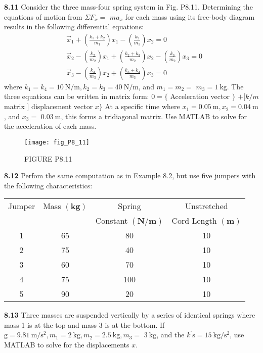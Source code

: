 \documentclass[../main.tex]{subfiles}
\begin{document}
\begin{multicols}{2}
    \noindent \textbf{8.11} Consider the three mass-four spring system in Fig. P8.11. Determining the equations of motion from $\Sigma F_{x}=$ $m a_{x}$ for each mass using its free-body diagram results in the
    following differential equations:
    $$
    \begin{aligned}
    &\vec{x}_{1}+\left(\frac{k_{1}+k_{2}}{m_{1}}\right) x_{1}-\left(\frac{k_{2}}{m_{1}}\right) x_{2}=0 \\
    &\vec{x}_{2}-\left(\frac{k_{2}}{m_{2}}\right) x_{1}+\left(\frac{k_{2}+k_{3}}{m_{2}}\right) x_{2}-\left(\frac{k_{3}}{m_{2}}\right) x_{3}=0 \\
    &\vec{x}_{3}-\left(\frac{k_{3}}{m_{3}}\right) x_{2}+\left(\frac{k_{3}+k_{4}}{m_{3}}\right) x_{3}=0
    \end{aligned}
    $$
    where $k_{1}=k_{4}=10 \mathrm{~N} / \mathrm{m}, k_{2}=k_{3}=40 \mathrm{~N} / \mathrm{m}$, and $m_{1}=m_{2}=$ $m_{3}=1 \mathrm{~kg}$. The three equations can be written in matrix form:
    $0=\{$ Acceleration vector $\}$
    $+[k / m$ matrix $]$ displacement vector $x\}$
    At a specific time where $x_{1}=0.05 \mathrm{~m}, x_{2}=0.04 \mathrm{~m}$, and $x_{3}=$ $0.03 \mathrm{~m}$, this forms a tridiagonal matrix. Use MATLAB to solve for the acceleration of each mass.
    
    \begin{figure}[H]
        \centering
        \texttt{[image: fig\_P8\_11]}
        \caption{\textsf{FIGURE P8.11}}
        \label{fig:fig_P8_11}
    \end{figure}

    \noindent \textbf{8.12} Perfom the same computation as in Example 8.2, but use five jumpers with the following characteristics:
    \begin{tabular}{cccc} 
    Jumper & Mass $(\mathbf{k g})$ & Spring  & Unstretched \\
    & & Constant $(\mathbf{N} / \mathbf{m})$ & Cord Length $(\mathbf{m})$ \\
    \hline 1 & 65 & 80 & 10 \\
    2 & 75 & 40 & 10 \\
    3 & 60 & 70 & 10 \\
    4 & 75 & 100 & 10 \\
    5 & 90 & 20 & 10
    \end{tabular}

    \noindent \textbf{8.13} Three masses are suspended vertically by a series of identical springs where mass 1 is at the top and mass 3 is at the bottom. If $\mathrm{g}=9.81 \mathrm{~m} / \mathrm{s}^{2}, m_{1}=2 \mathrm{~kg}, m_{2}=2.5 \mathrm{~kg}, m_{3}=$ $3 \mathrm{~kg}$, and the $k^{\prime} \mathrm{s}=15 \mathrm{~kg} / \mathrm{s}^{2}$, use MATLAB to solve for the displacements $x$.
    

\end{multicols}
\end{document}
